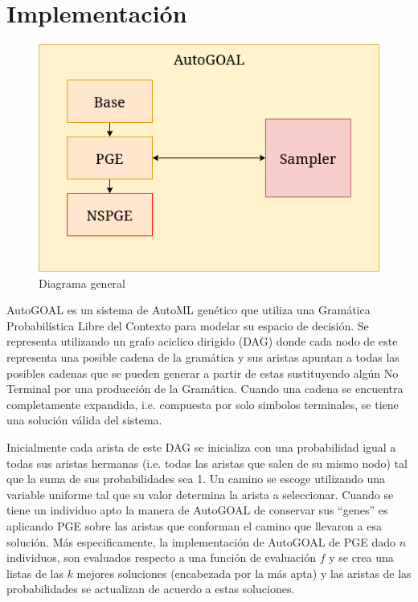\section{Implementaci\'on}

\begin{figure}[ht]
    \centering
    \includegraphics[scale=0.6]{Pictures/autogoal_impl.png}
    \caption{Diagrama general}
    \label{impl:fig:general_diagram}
\end{figure}


AutoGOAL es un sistema de AutoML gen\'etico que utiliza una Gram\'atica Probabil\'istica Libre del Contexto  para modelar su espacio de decisi\'on. Se representa utilizando un grafo aciclico dirigido (DAG) donde cada nodo de este representa una posible cadena de la gram\'atica y sus aristas apuntan a todas las posibles cadenas que se pueden generar a partir de estas sustituyendo alg\'un No Terminal por una producci\'on de la Gram\'atica. Cuando una cadena se encuentra completamente expandida, i.e. compuesta por solo simbolos terminales, se tiene una soluci\'on v\'alida del sistema. 

Inicialmente cada arista de este DAG se inicializa con una probabilidad igual a todas sus aristas hermanas (i.e. todas las aristas que salen de su mismo nodo) tal que la suma de sus probabilidades sea 1. Un camino se escoge utilizando una variable uniforme tal que su valor determina la arista a seleccionar. Cuando se tiene un individuo apto la manera de AutoGOAL de conservar sus ``genes'' es aplicando PGE sobre las aristas que conforman el camino que llevaron a esa soluci\'on. M\'as especificamente, la implementaci\'on de AutoGOAL de PGE dado $n$ individuos, son evaluados respecto a una funci\'on de evaluaci\'on $f$ y se crea una listas de las $k$ mejores soluciones (encabezada por la m\'as apta) y las aristas de las probabilidades se actualizan de acuerdo a estas soluciones. 

